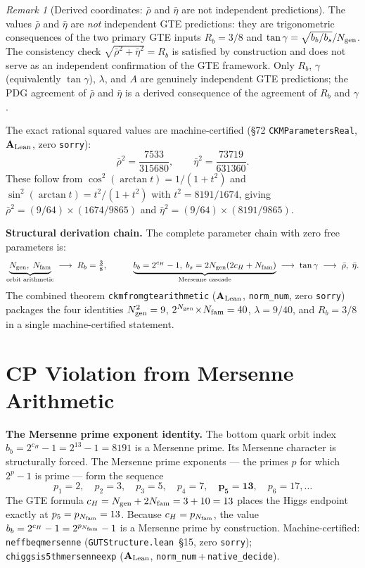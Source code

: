 \documentclass[11pt]{article}
\theoremstyle{remark}
\newtheorem{remark}[theorem]{Remark}
\newcommand{\Ngen}{N_{\rm gen}}
\newcommand{\Nfam}{N_{\rm fam}}
\newcommand{\cH}{c_H}
\newcommand{\lean}[1]{%
  \penalty-100
  \begingroup\def\_{\textunderscore\allowbreak}\texttt{#1}\endgroup}
\newcommand{\lam}{\lambda}
\newcommand{\Rbar}{\bar{\rho}}
\newcommand{\Ebar}{\bar{\eta}}
\newcommand{\bs}{b_s}
\newcommand{\bb}{b_b}
\newcommand{\Rb}{R_b}
\newcommand{\CatAL}{\ensuremath{\textbf{A}_{\rm Lean}}}
\begin{document}
\begin{remark}[Derived coordinates: $\Rbar$ and $\Ebar$ are not independent predictions]
\label{rem:rhobar_etabar_derived}
The values $\Rbar$ and $\Ebar$ are \emph{not} independent GTE predictions: they are
trigonometric consequences of the two primary GTE inputs $\Rb = 3/8$ and
$\tan\gamma = \sqrt{\bb/\bs}/\Ngen$.
The consistency check $\sqrt{\Rbar^2+\Ebar^2} = \Rb$ is satisfied by construction and
does not serve as an independent confirmation of the GTE framework.
Only $\Rb$, $\gamma$ (equivalently $\tan\gamma$), $\lam$, and $A$ are genuinely independent
GTE predictions; the PDG agreement of $\Rbar$ and $\Ebar$ is a derived consequence of
the agreement of $\Rb$ and $\gamma$.

The exact rational squared values are machine-certified (\S72 \texttt{CKMParametersReal},
\CatAL{}, zero \texttt{sorry}):
\begin{equation}
  \bar\rho^2 = \frac{7533}{315680}, \qquad \bar\eta^2 = \frac{73719}{631360}.
\end{equation}
These follow from $\cos^2(\arctan t) = 1/(1+t^2)$ and $\sin^2(\arctan t) = t^2/(1+t^2)$
with $t^2 = 8191/1674$, giving $\bar\rho^2 = (9/64)\times(1674/9865)$ and
$\bar\eta^2 = (9/64)\times(8191/9865)$.
\end{remark}

\medskip

\textbf{Structural derivation chain.}
The complete parameter chain with zero free parameters is:
\[
  \underbrace{\Ngen,\;\Nfam}_{\text{orbit arithmetic}}
  \;\longrightarrow\; \Rb = \tfrac{3}{8},
  \qquad\quad
  \underbrace{\bb = 2^{\cH}-1,\;\bs = 2\Ngen(2\cH+\Nfam)}_{\text{Mersenne cascade}}
  \;\longrightarrow\; \tan\gamma
  \;\longrightarrow\; \Rbar,\;\Ebar.
\]
The combined theorem \lean{ckm\_from\_gte\_arithmetic} ($\CatAL$, \texttt{norm\_num},
zero \texttt{sorry}) packages the four identities $\Ngen^2 = 9$,
$2^{\Ngen}\!\times\!\Nfam = 40$, $\lam = 9/40$, and $\Rb = 3/8$ in a single
machine-certified statement.

\section{CP Violation from Mersenne Arithmetic}
\label{sec:cp}

\textbf{The Mersenne prime exponent identity.}
The bottom quark orbit index $\bb = 2^{\cH}-1 = 2^{13}-1 = 8191$ is a Mersenne prime.
Its Mersenne character is structurally forced.
The Mersenne prime exponents --- the primes $p$ for which $2^p-1$ is prime --- form the
sequence
\[
  p_1 = 2,\quad p_2 = 3,\quad p_3 = 5,\quad p_4 = 7,\quad
  \mathbf{p_5 = 13},\quad p_6 = 17,\ldots
\]
The GTE formula $\cH = \Ngen + 2\Nfam = 3+10 = 13$ places the Higgs endpoint exactly
at $p_5 = p_{\Nfam} = 13$.
Because $\cH = p_{\Nfam}$, the value $\bb = 2^{\cH}-1 = 2^{p_{\Nfam}}-1$ is a Mersenne
prime by construction.
Machine-certified: \lean{neff\_b\_eq\_mersenne} (\texttt{GUTStructure.lean}~\S15,
zero \texttt{sorry}); \lean{chiggs\_is\_5th\_mersenne\_exp} ($\CatAL$,
\texttt{norm\_num}\,+\,\texttt{native\_decide}).
\end{document}
